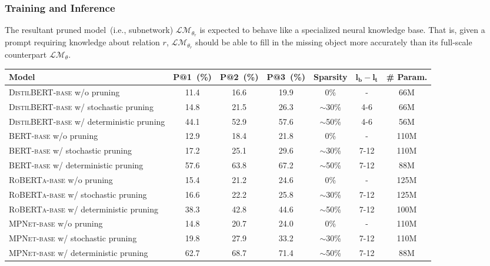 \subsubsection{Training and Inference}
\label{sec:training}
The resultant pruned  model~(i.e., subnetwork) $\mathcal{LM}_{\theta_r}$ is expected to behave like a specialized neural knowledge base. That is, given a prompt requiring knowledge about relation $r$, $\mathcal{LM}_{\theta_r}$ should be able to fill in the missing object more accurately than its full-scale counterpart $\mathcal{LM}_{\theta}$.
\begin{table*}[!t]
	\centering
	\small
	\begin{tabular}{l|ccc|c|c|c}
		\toprule
		\textbf{Model} & \textbf{P@1~(\%)} & \textbf{P@2~(\%)} & \textbf{P@3~(\%)} & \textbf{Sparsity}  & $\bm{l_b-l_t}$ & \textbf{\# Param.}\\
		\midrule
		\textsc{DistilBERT-base} w/o pruning& 11.4 &16.6  &19.9  & 0\% & - & 66M\\
		\textsc{DistilBERT-base} w/ stochastic pruning & 14.8 &21.5 &26.3 & $\sim$30\% & 4-6 &66M \\
		\textsc{DistilBERT-base} w/ deterministic pruning & 44.1 &52.9 &57.6 & $\sim$50\% & 4-6 &56M \\
		\midrule
		\textsc{BERT-base} w/o pruning& 12.9 & 18.4  & 21.8 & 0\% & -  &110M\\
		\textsc{BERT-base} w/ stochastic pruning & 17.2 & 25.1  & 29.6  & $\sim$30\% & 7-12 & 110M\\
		\textsc{BERT-base} w/ deterministic pruning & 57.6 & 63.8  & 67.2  & $\sim$50\% & 7-12 & 88M\\
		\midrule
		\textsc{RoBERTa-base} w/o pruning& 15.4 & 21.2  & 24.6 & 0\% & - &125M  \\
		\textsc{RoBERTa-base} w/ stochastic pruning &16.6  &22.2   &25.8   & $\sim$30\% & 7-12 & 125M\\
		\textsc{RoBERTa-base} w/ deterministic pruning &38.3  &42.8   &44.6   & $\sim$50\% & 7-12 &100M \\
		\midrule
		\textsc{MPNet-base} w/o pruning& 14.8  &20.7   &24.0 & 0\%  & - & 110M\\
		\textsc{MPNet-base} w/ stochastic pruning &19.8  &27.9   &33.2  & $\sim$30\% & 7-12  & 110M\\
		\textsc{MPNet-base} w/ deterministic pruning &62.7  &68.7   &71.4  & $\sim$50\% & 7-12 &88M \\

\end{tabular}
\end{table*}
